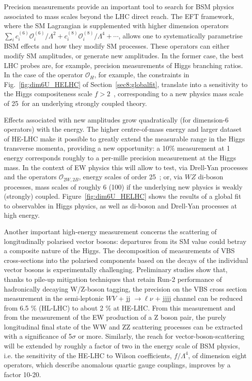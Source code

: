 \documentclass[../report.tex]{subfiles}
\begin{document}
Precision measurements provide an important tool to search for BSM physics associated to mass scales beyond the LHC direct reach. The EFT framework, where the SM Lagrangian is supplemented with higher dimension operators $\sum_{i} c_i^{(6)}\mathcal{O}^{(6)}_i/\Lambda^2+c_i^{(8)}\mathcal{O}^{(8)}_i/\Lambda^4+\cdots$, allows one to systematically parametrise BSM effects and how they modify SM processes. These operators can either modify SM amplitudes, or generate new amplitudes. In the former case, the best LHC probes are, for example, precision measurements of Higgs branching ratios. In the case of the operator $\mathcal{O}_H$, for example, the constraints in Fig.~\ref{fig:dim6U_HELHC} of Section~\ref{sec8:globalfit}, translate into a sensitivity to the Higgs compositeness scale $f>2$~\UTeV, corresponding to a new physics mass scale of 25~\UTeV for an underlying strongly coupled theory.

Effects associated with  new amplitudes grow quadratically (for dimension-6 operators) with the energy. The higher centre-of-mass energy and larger dataset of HE-LHC make it possible to greatly extend the measurable range in the Higgs transverse momenta, providing a new opportunity: a 10\% measurement  at 1 \UTeV energy corresponds roughly to a per-mille  precision measurement at the Higgs mass. 
In the context of EW physics this will allow  to test, via Drell-Yan processes and  the operators $\mathcal{O}_{2W,2B}$, energy scales of order 25~\UTeV; or, via $WZ$ di-boson processes, mass scales of roughly 6 (100) \UTeV if the underlying new physics is weakly (strongly) coupled.
Figure~\ref{fig:dim6U_HELHC} shows the results of a global fit  to observables in Higgs physics, as well as di-boson and Drell-Yan processes at high energy. 

Another important high-energy measurement concerns the scattering of longitudinally polarised vector bosons: departures from its SM value could betray a composite nature of the Higgs.
The decomposition of measurements of VBS cross-sections into the polarised components based on the decays of the individual vector bosons is experimentally challenging. Preliminary studies show that, thanks to pile-up mitigation techniques that retain Run-2 performance of hadronically decaying W/Z-boson tagging, the precision on the VBS cross section measurement in the semi-leptonic $W V$ + jj $\to \ell\nu$ + jjjj channel can be reduced from 6.5 $\%$ (HL-LHC) to about 2 $\%$ at HE-LHC. From this measurement and from the measurement of the EW production of a Z boson pair, the purely longitudinal final state of the WW and ZZ scattering processes can be extracted with a significance of 5$\sigma$ or more. Similarly, the reach for vector-boson-scattering will be extended by roughly a factor of two in the energy scale of BSM physics, i.e. the sensitivity of the HE-LHC to Wilson coefficients, $f/\Lambda^4$, of dimension eight operators, which describe anomalous quartic gauge couplings, improves by a factor 10-20.
\end{document}
